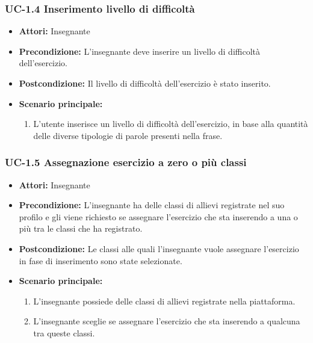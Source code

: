 \subsubsection{UC-1.4 Inserimento livello di difficoltà}
\begin{itemize}
\item \textbf{Attori: }Insegnante

\item \textbf{Precondizione: }L'insegnante deve inserire un livello di difficoltà dell'esercizio.
\item \textbf{Postcondizione: }Il livello di difficoltà dell'esercizio è stato inserito.
\item \textbf{Scenario principale: }
		\begin{enumerate}
		\item L'utente inserisce un livello di difficoltà dell'esercizio, in base alla quantità delle diverse tipologie di parole presenti nella frase.
		\end{enumerate}
\end{itemize}
\subsubsection{UC-1.5 Assegnazione esercizio a zero o più classi}
\begin{itemize}
\item \textbf{Attori: }Insegnante

\item \textbf{Precondizione: }L'insegnante ha delle classi di allievi registrate nel suo profilo e gli viene richiesto se assegnare l'esercizio che sta inserendo a una o più tra le classi che ha registrato.
\item \textbf{Postcondizione: }Le classi alle quali l'insegnante vuole assegnare l'esercizio in fase di inserimento sono state selezionate.
\item \textbf{Scenario principale: }
		\begin{enumerate}
		\item L'insegnante possiede delle classi di allievi registrate nella piattaforma.
		\item L'insegnante sceglie se assegnare l'esercizio che sta inserendo a qualcuna tra queste classi.
		\end{enumerate}
\end{itemize}

